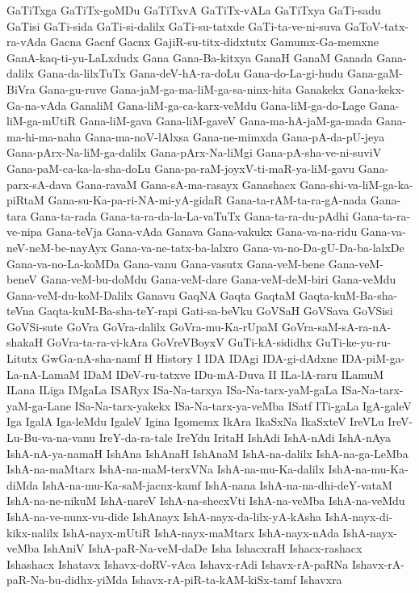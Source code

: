 {GaTiTxga
GaTiTx-goMDu
GaTiTxvA
GaTiTx-vALa
GaTiTxya
GaTi-sadu
GaTisi
GaTi-sida
GaTi-si-dalilx
GaTi-su-tatxde
GaTi-ta-ve-ni-suva
GaToV-tatx-ra-vAda
Gacna
Gacnf
Gacnx
GajiR-su-titx-didxtutx
Gamumx-Ga-memxne
GanA-kaq-ti-yu-LaLxdudx
Gana
Gana-Ba-kitxya
GanaH
GanaM
Ganada
Gana-dalilx
Gana-da-lilxTuTx
Gana-deV-hA-ra-doLu
Gana-do-La-gi-hudu
Gana-gaM-BiVra
Gana-gu-ruve
Gana-jaM-ga-ma-liM-ga-sa-ninx-hita
Ganakekx
Gana-kekx-Ga-na-vAda
GanaliM
Gana-liM-ga-ca-karx-veMdu
Gana-liM-ga-do-Lage
Gana-liM-ga-mUtiR
Gana-liM-gava
Gana-liM-gaveV
Gana-ma-hA-jaM-ga-mada
Gana-ma-hi-ma-naha
Gana-ma-noV-lAlxsa
Gana-ne-mimxda
Gana-pA-da-pU-jeya
Gana-pArx-Na-liM-ga-dalilx
Gana-pArx-Na-liMgi
Gana-pA-sha-ve-ni-suviV
Gana-paM-ca-ka-la-sha-doLu
Gana-pa-raM-joyxV-ti-maR-ya-liM-gavu
Gana-parx-sA-dava
Gana-ravaM
Gana-sA-ma-rasayx
Ganashacx
Gana-shi-va-liM-ga-ka-piRtaM
Gana-su-Ka-pa-ri-NA-mi-yA-gidaR
Gana-ta-rAM-ta-ra-gA-nada
Gana-tara
Gana-ta-rada
Gana-ta-ra-da-la-La-vaTuTx
Gana-ta-ra-du-pAdhi
Gana-ta-ra-ve-nipa
Gana-teVja
Gana-vAda
Ganava
Gana-vakukx
Gana-va-na-ridu
Gana-va-neV-neM-be-nayAyx
Gana-va-ne-tatx-ba-lalxro
Gana-va-no-Da-gU-Da-ba-lalxDe
Gana-va-no-La-koMDa
Gana-vanu
Gana-vasutx
Gana-veM-bene
Gana-veM-beneV
Gana-veM-bu-doMdu
Gana-veM-dare
Gana-veM-deM-biri
Gana-veMdu
Gana-veM-du-koM-Dalilx
Ganavu
GaqNA
Gaqta
GaqtaM
Gaqta-kuM-Ba-sha-teVna
Gaqta-kuM-Ba-sha-teY-rapi
Gati-sa-beVku
GoVSaH
GoVSava
GoVSisi
GoVSi-sute
GoVra
GoVra-dalilx
GoVra-mu-Ka-rUpaM
GoVra-saM-sA-ra-nA-shakaH
GoVra-ta-ra-vi-kAra
GoVreVBoyxV
GuTi-kA-sididhx
GuTi-ke-yu-ru-Litutx
GwGa-nA-sha-namf
H
History
I
IDA
IDAgi
IDA-gi-dAdxne
IDA-piM-ga-La-nA-LamaM
IDaM
IDeV-ru-tatxve
IDu-mA-Duva
II
ILa-lA-raru
ILamuM
ILana
ILiga
IMgaLa
ISARyx
ISa-Na-tarxya
ISa-Na-tarx-yaM-gaLa
ISa-Na-tarx-yaM-ga-Lane
ISa-Na-tarx-yakekx
ISa-Na-tarx-ya-veMba
ISatf
ITi-gaLa
IgA-galeV
Iga
IgalA
Iga-leMdu
IgaleV
Igina
Igomemx
IkAra
IkaSxNa
IkaSxteV
IreVLu
IreV-Lu-Bu-va-na-vanu
IreY-da-ra-tale
IreYdu
IritaH
IshAdi
IshA-nAdi
IshA-nAya
IshA-nA-ya-namaH
IshAna
IshAnaH
IshAnaM
IshA-na-dalilx
IshA-na-ga-LeMba
IshA-na-maMtarx
IshA-na-maM-terxVNa
IshA-na-mu-Ka-dalilx
IshA-na-mu-Ka-diMda
IshA-na-mu-Ka-saM-jacnx-kamf
IshA-nana
IshA-na-na-dhi-deY-vataM
IshA-na-ne-nikuM
IshA-nareV
IshA-na-shecxVti
IshA-na-veMba
IshA-na-veMdu
IshA-na-ve-nunx-vu-dide
IshAnayx
IshA-nayx-da-lilx-yA-kAsha
IshA-nayx-di-kikx-nalilx
IshA-nayx-mUtiR
IshA-nayx-maMtarx
IshA-nayx-nAda
IshA-nayx-veMba
IshAniV
IshA-paR-Na-veM-daDe
Isha
IshacxraH
Ishacx-rashacx
Ishashacx
Ishatavx
Ishavx-doRV-vAca
Ishavx-rAdi
Ishavx-rA-paRNa
Ishavx-rA-paR-Na-bu-didhx-yiMda
Ishavx-rA-piR-ta-kAM-kiSx-tamf
Ishavxra
}
